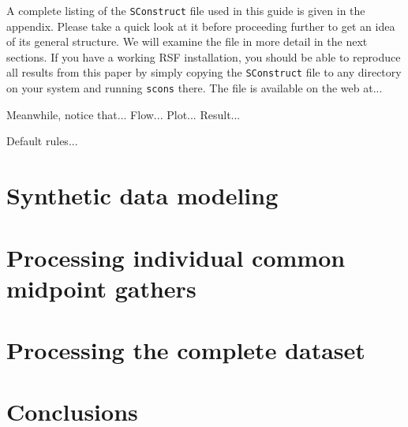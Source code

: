 A complete listing of the \texttt{SConstruct} file used in this guide
is given in the appendix. Please take a quick look at it before
proceeding further to get an idea of its general structure. We will
examine the file in more detail in the next sections. If you have a
working RSF installation, you should be able to reproduce all results
from this paper by simply copying the \texttt{SConstruct} file to any
directory on your system and running \texttt{scons} there. The file is
available on the web at...

Meanwhile, notice that... Flow... Plot... Result...

Default rules...

\section{Synthetic data modeling}

 \clearpage
{} \clearpage
{} \clearpage
{} \clearpage

\section{Processing individual common midpoint gathers}

 \clearpage
{} \clearpage
{} \clearpage
{} \clearpage
{} \clearpage

\section{Processing the complete dataset}

 \clearpage
{} \clearpage

\section{Conclusions}

